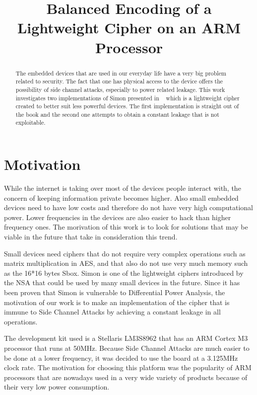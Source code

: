 \documentclass[conference]{IEEEtran}
\begin{document}
\title{Balanced Encoding of a Lightweight Cipher on an ARM Processor}


\author{
}
\maketitle

\begin{abstract}

  The embedded devices that are used in our everyday life have a very big problem related to security. The fact that one has physical access to the device offers the possibility of side channel attacks, especially to power related leakage. This work investigates two implementations of Simon presented in ~\cite{Beaulieu_Simon} which is a lightweight cipher created to better suit less powerful devices. The first implementation is straight out of the book and the second one attempts to obtain a constant leakage that is not exploitable.

\end{abstract}

\section{Motivation}

While the internet is taking over most of the devices people interact with, the concern of keeping information private becomes higher. Also small embedded devices need to have low costs and therefore do not have very high computational power. Lower frequencies in the devices are also easier to hack than higher frequency ones. The morivation of this work is to look for solutions that may be viable in the future that take in consideration this trend.

Small devices need ciphers that do not require very complex operations such as matrix multiplication in AES, and that also do not use very much memory such as the 16*16 bytes Sbox. Simon is one of the lightweight ciphers introduced by the NSA that could be used by many small devices in the future. Since it has been proven that Simon is vulnerable to Differential Power Analysis, the motivation of our work is to make an implementation of the cipher that is immune to Side Channel Attacks by achieving a constant leakage in all operations.

The development kit used is a Stellaris LM3S8962 that has an ARM Cortex M3 processor that runs at 50MHz. Because Side Channel Attacks are much easier to be done at a lower frequency, it was decided to use the board at a 3.125MHz clock rate. The motivation for choosing this platform was the popularity of ARM processors that are nowadays used in a very wide variety of products because of their very low power consumption.
\end{document}
